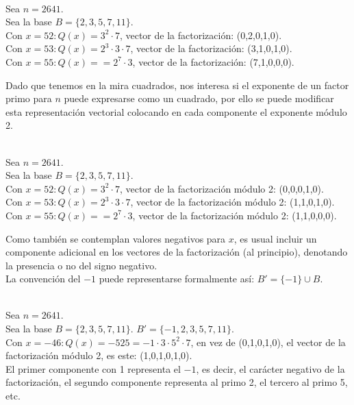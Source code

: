 \begin{ejemplo} \, \\
Sea $n=2641$. \\
Sea la base $B = \{ 2,3,5,7,11 \}$. \\
Con $x=52: Q(x)=3^2\cdot 7$, vector de la factorización: (0,2,0,1,0). \\
Con $x=53: Q(x)=2^3\cdot 3\cdot 7$, vector de la factorización: (3,1,0,1,0). \\
Con $x=55: Q(x)==2^7\cdot 3$, vector de la factorización: (7,1,0,0,0). 
\end{ejemplo}

Dado que tenemos en la mira cuadrados, nos interesa si el exponente de un factor primo para $n$ puede expresarse como un cuadrado, por ello se puede modificar esta representación vectorial colocando en cada componente el exponente módulo 2.

\begin{ejemplo} \, \\
Sea $n=2641$. \\
Sea la base $B = \{ 2,3,5,7,11 \}$. \\
Con $x=52: Q(x)=3^2\cdot 7$, vector de la factorización módulo 2: (0,0,0,1,0). \\
Con $x=53: Q(x)=2^3\cdot 3\cdot 7$, vector de la factorización módulo 2: (1,1,0,1,0). \\
Con $x=55: Q(x)==2^7\cdot 3$, vector de la factorización módulo 2: (1,1,0,0,0). 
\end{ejemplo}

Como también se contemplan valores negativos para $x$, es usual incluir un componente adicional en los vectores de la factorización (al principio), denotando la presencia o no del signo negativo. \\
La convención del $-1$ puede representarse formalmente así: $B' = \{-1\} \cup B$.

\begin{ejemplo} \, \\
Sea $n=2641$. \\
Sea la base $B = \{ 2,3,5,7,11 \}$. $B' = \{ -1,2,3,5,7,11 \}$. \\
Con $x=-46: Q(x)=-525=-1 \cdot 3 \cdot 5^2\cdot 7$, en vez de (0,1,0,1,0), el vector de la factorización módulo 2, es este: (1,0,1,0,1,0). \\
El primer componente con 1 representa el $-1$, es decir, el carácter negativo de la factorización, el segundo componente representa al primo 2, el tercero al primo 5, etc.
\end{ejemplo}

